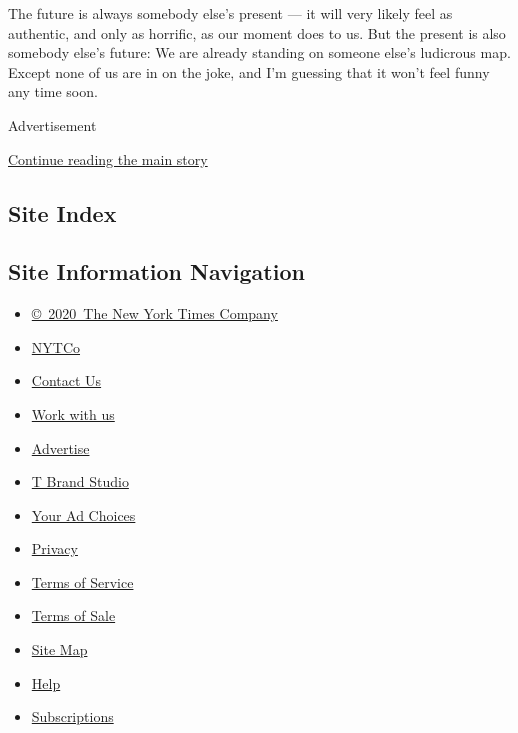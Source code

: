 The future is always somebody else's present --- it will very likely
feel as authentic, and only as horrific, as our moment does to us. But
the present is also somebody else's future: We are already standing on
someone else's ludicrous map. Except none of us are in on the joke, and
I'm guessing that it won't feel funny any time soon.

Advertisement

\protect\hyperlink{after-bottom}{Continue reading the main story}

\hypertarget{site-index}{%
\subsection{Site Index}\label{site-index}}

\hypertarget{site-information-navigation}{%
\subsection{Site Information
Navigation}\label{site-information-navigation}}

\begin{itemize}
\tightlist
\item
  \href{https://help.nytimes3xbfgragh.onion/hc/en-us/articles/115014792127-Copyright-notice}{©~2020~The
  New York Times Company}
\end{itemize}

\begin{itemize}
\tightlist
\item
  \href{https://www.nytco.com/}{NYTCo}
\item
  \href{https://help.nytimes3xbfgragh.onion/hc/en-us/articles/115015385887-Contact-Us}{Contact
  Us}
\item
  \href{https://www.nytco.com/careers/}{Work with us}
\item
  \href{https://nytmediakit.com/}{Advertise}
\item
  \href{http://www.tbrandstudio.com/}{T Brand Studio}
\item
  \href{https://www.nytimes3xbfgragh.onion/privacy/cookie-policy\#how-do-i-manage-trackers}{Your
  Ad Choices}
\item
  \href{https://www.nytimes3xbfgragh.onion/privacy}{Privacy}
\item
  \href{https://help.nytimes3xbfgragh.onion/hc/en-us/articles/115014893428-Terms-of-service}{Terms
  of Service}
\item
  \href{https://help.nytimes3xbfgragh.onion/hc/en-us/articles/115014893968-Terms-of-sale}{Terms
  of Sale}
\item
  \href{https://spiderbites.nytimes3xbfgragh.onion}{Site Map}
\item
  \href{https://help.nytimes3xbfgragh.onion/hc/en-us}{Help}
\item
  \href{https://www.nytimes3xbfgragh.onion/subscription?campaignId=37WXW}{Subscriptions}
\end{itemize}
